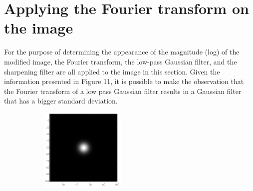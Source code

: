 \section{Applying the Fourier transform on the image}\label{P4}

For the purpose of determining the appearance of the magnitude (log) of the modified image, the Fourier transform, the low-pass Gaussian filter, and the sharpening filter are all applied to the image in this section. Given the information presented in Figure 11, it is possible to make the observation that the Fourier transform of a low pass Gaussian filter results in a Gaussian filter that has a bigger standard deviation. 

\begin{figure}
    \centering
    \begin{subfigure}{0.4\textwidth}
        \includegraphics[width=\textwidth]{Resources/F11-a.png}
        \caption{}
        \label{fig:first}
    \end{subfigure}
    \hfill
    \begin{subfigure}{0.4\textwidth}

\end{subfigure}
\end{figure}
